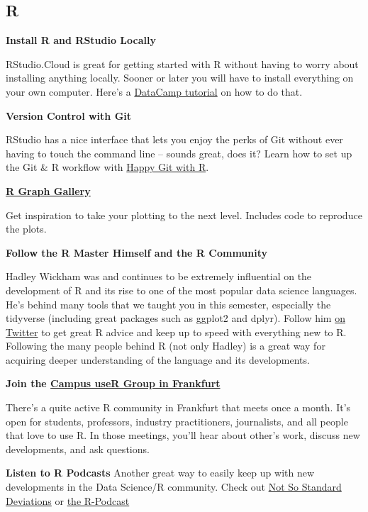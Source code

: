 \documentclass[
  11pt,
]{article}
\newenvironment{tips}[1]
  {
  \begin{itemize}
  \footnotesize
  \renewcommand{\labelitemi}{
    \raisebox{-.7\height}[0pt][0pt]{
      {\setkeys{Gin}{width=3em,keepaspectratio}
        \texttt{[image: images/\#1.png]}}
    }
  }
  \setlength{\fboxsep}{1em}
  \begin{rbox}
  \item
  }
  {
  \end{rbox}
  \end{itemize}
  }
\begin{document}
\hypertarget{r}{%
\subsection{R}\label{r}}

\begin{tips}r

\textbf{Install R and RStudio Locally}

RStudio.Cloud is great for getting started with R without having to worry about installing anything locally. Sooner or later you will have to install everything on your own computer. Here's a \href{https://www.datacamp.com/community/tutorials/installing-R-windows-mac-ubuntu}{DataCamp tutorial} on how to do that.

\textbf{Version Control with Git}

RStudio has a nice interface that lets you enjoy the perks of Git without ever having to touch the command line -- sounds great, does it? Learn how to set up the Git \& R workflow with \href{https://happygitwithr.com/}{Happy Git with R}.

\textbf{\href{https://www.r-graph-gallery.com/}{R Graph Gallery}}

Get inspiration to take your plotting to the next level. Includes code to reproduce the plots.

\textbf{Follow the R Master Himself and the R Community}

Hadley Wickham was and continues to be extremely influential on the development of R and its rise to one of the most popular data science languages. He's behind many tools that we taught you in this semester, especially the tidyverse (including great packages such as ggplot2 and dplyr). Follow him \href{https://twitter.com/hadleywickham}{on Twitter} to get great R advice and keep up to speed with everything new to R. Following the many people behind R (not only Hadley) is a great way for acquiring deeper understanding of the language and its developments.

\textbf{Join the \href{https://www.meetup.com/r-frankfurt/}{Campus useR Group in Frankfurt}}

There's a quite active R community in Frankfurt that meets once a month. It's open for students, professors, industry practitioners, journalists, and all people that love to use R. In those meetings, you'll hear about other's work, discuss new developments, and ask questions.

\textbf{Listen to R Podcasts}
Another great way to easily keep up with new developments in the Data Science/R community. Check out
\href{http://nssdeviations.com/}{Not So Standard Deviations} or \href{https://r-podcast.org/}{the R-Podcast}

\end{tips}
\end{document}

